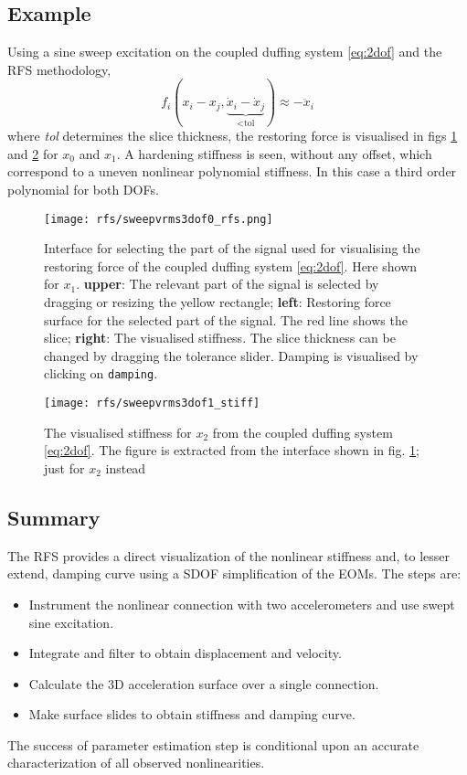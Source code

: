 \subsection{Example}
\label{sec:rfs_example}

Using a sine sweep excitation on the coupled duffing system \eqref{eq:2dof} and
the RFS methodology,
\begin{equation}
  \label{eq:rfs_tol}
  f_i (x_i - x_j , \underbrace{\dot x_i - \dot x_j}_\text{<tol}) \approx - \ddot x_i
\end{equation}
where \textit{tol} determines the slice thickness, the restoring force is
visualised in figs \ref{fig:rfs_full} and \ref{fig:rfs_stiff} for $x_0$ and
$x_1$. A hardening stiffness is seen, without any offset, which correspond to a
uneven nonlinear polynomial stiffness. In this case a third order polynomial for
both DOFs.

\begin{figure}[!ht]
  \centering
  \texttt{[image: rfs/sweepvrms3dof0\_rfs.png]}
  \caption{Interface for selecting the part of the signal used for
    visualising the restoring force of the coupled duffing system
    \eqref{eq:2dof}. Here shown for $x_1$.
    \textbf{upper}: The relevant part of the signal is selected by dragging or
    resizing the yellow rectangle;
    \textbf{left}: Restoring force surface for the selected part of the signal.
    The red line shows the slice;
    \textbf{right}: The visualised stiffness. The slice thickness can be changed
    by dragging the tolerance slider. Damping is visualised by clicking on
    \texttt{damping}.
  }
  \label{fig:rfs_full}
\end{figure}


\begin{figure}[!ht]
  \centering
  \texttt{[image: rfs/sweepvrms3dof1\_stiff]}
  \caption{The visualised stiffness for $x_2$ from the coupled duffing system
    \eqref{eq:2dof}.
    The figure is extracted from the interface shown in fig. \ref{fig:rfs_full};
    just for $x_2$ instead}
  \label{fig:rfs_stiff}
\end{figure}

\subsection{Summary}
\label{sec:rfs_summary}

The RFS provides a direct visualization of the nonlinear stiffness and, to
lesser extend, damping curve using a SDOF simplification of the EOMs. The steps
are:
\begin{itemize}
\item Instrument the nonlinear connection with two accelerometers and use swept
  sine excitation.
\item Integrate and filter to obtain displacement and velocity.
\item Calculate the 3D acceleration surface over a single connection.
\item Make surface slides to obtain stiffness and damping curve.
\end{itemize}

The success of parameter estimation step is conditional upon an accurate
characterization of all observed nonlinearities.



